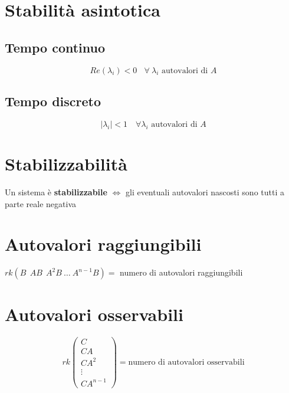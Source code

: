 \documentclass{report}
\theoremstyle{nostyle}
\begin{document}
\section{Stabilità asintotica}
\subsection*{Tempo continuo}
\[   Re(\lambda_i) < 0\ \ \ \ \forall \ \lambda_i \text{ autovalori di } A   \]
\subsection*{Tempo discreto}
$$|\lambda_i| < 1 \quad \forall \lambda_i \text{ autovalori di } A$$

\section*{Stabilizzabilità}
\begin{center}
    Un sistema è \textbf{stabilizzabile} $\Longleftrightarrow$ gli eventuali autovalori nascosti sono tutti a parte reale negativa
\end{center}







\section{Autovalori raggiungibili}
\begin{center}
    $rk(B\ \ AB \ \ A^2 B \ \dots\ A^{n-1}B) = $ numero di autovalori raggiungibili
\end{center}

\section{Autovalori osservabili}
\begin{center}
    \[rk \begin{pmatrix}
        C \\ CA \\ CA^2 \\\vdots \\ CA^{n-1}
    \end{pmatrix} = \text{numero di autovalori osservabili}\]
\end{center}
\end{document}
